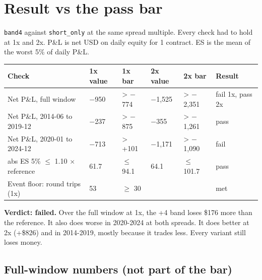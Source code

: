 \documentclass{article}
\begin{document}
\section{Result vs the pass bar}

\texttt{band4} against \texttt{short\_\allowbreak{}only} at the same spread multiple. Every check had to hold at 1x and 2x. P\&L is net USD on daily equity for 1 contract. ES is the mean of the worst 5\% of daily P\&L.

\begin{center}\small
\begin{tabularx}{\linewidth}{>{\raggedright\arraybackslash}X l l l l >{\raggedright\arraybackslash}X}
\toprule
\textbf{Check} & \textbf{1x value} & \textbf{1x bar} & \textbf{2x value} & \textbf{2x bar} & \textbf{Result} \\
\midrule
Net P\&L, full window & \ensuremath{-}950 & > \ensuremath{-}774 & \ensuremath{-}1,525 & > \ensuremath{-}2,351 & fail 1x, pass 2x \\
Net P\&L, 2014-06 to 2019-12 & \ensuremath{-}237 & > \ensuremath{-}875 & \ensuremath{-}355 & > \ensuremath{-}1,261 & pass \\
Net P\&L, 2020-01 to 2024-12 & \ensuremath{-}713 & > +101 & \ensuremath{-}1,171 & > \ensuremath{-}1,090 & fail \\
abs ES 5\% \ensuremath{\leq} 1.10 \ensuremath{\times} reference & 61.7 & \ensuremath{\leq} 94.1 & 64.1 & \ensuremath{\leq} 101.7 & pass \\
Event floor: round trips (1x) & 53 & \ensuremath{\geq} 30 &  &  & met \\
\bottomrule
\end{tabularx}
\end{center}

\textbf{Verdict: failed.} Over the full window at 1x, the +4 band loses \$176 more than the reference. It also does worse in 2020-2024 at both spreads. It does better at 2x (+\$826) and in 2014-2019, mostly because it trades less. Every variant still loses money.

\subsection{Full-window numbers (not part of the bar)}
\end{document}
